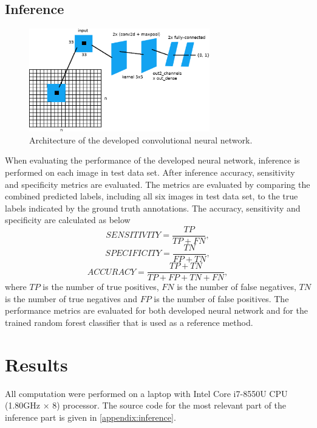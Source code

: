 \documentclass[aps,prb,10pt,twocolumn,groupedaddress]{revtex4-1}
\begin{document}
\subsection{Inference}
\label{sec:computational_methods_inference}
\begin{figure}[!t]
	\centering
	\includegraphics[width=0.7\textwidth]{images/net_cropped.eps}
	\caption{Architecture of the developed convolutional neural network.}
	\label{fig:net}
\end{figure}
When evaluating the performance of the developed neural network, inference is performed on each image in test data set. After inference accuracy, sensitivity and specificity metrics are evaluated. The metrics are evaluated by comparing the combined predicted labels, including all six images in test data set, to the true labels indicated by the ground truth annotations. The accuracy, sensitivity and specificity are calculated as below  
\begin{equation}
	SENSITIVITY = \frac{TP}{TP + FN},
	\label{eq:sensitivity}
\end{equation}
\begin{equation}
	SPECIFICITY = \frac{TN}{FP + TN},
	\label{eq:specifity}
\end{equation}
\begin{equation}
	ACCURACY = \frac{TP + TN}{TP + FP + TN + FN},
	\label{eq:accuracy}
\end{equation}
where $TP$ is the number of true positives, $FN$ is the number of false negatives, $TN$ is the number of true negatives and $FP$ is the number of false positives.
The performance metrics are evaluated for both developed neural network and for the trained random forest classifier that is used as a reference method.


\section{Results}
\label{sec:results}
All computation were performed on a laptop  with Intel Core i7-8550U CPU (1.80GHz × 8) processor. The source code for the most relevant part of the inference part is given in \ref{appendix:inference}.
\end{document}
